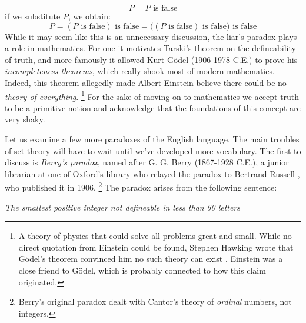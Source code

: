         \begin{equation}
            P=P\text{ is false}
        \end{equation}
        if we substitute $P$, we obtain:
        \begin{equation}
            P=(P\text{ is false})\text{ is false}
             =\big((P\text{ is false})\text{ is false}\big)\text{ is false}
        \end{equation}
        While it may seem like this is an unnecessary discussion, the liar's
        paradox plays a role in mathematics. For one it motivates Tarski's
        theorem on the defineability of truth, and more famously it allowed Kurt
        G\"{o}del (1906-1978 C.E.) to prove his
        \textit{incompleteness theorems}, which really shook most of modern
        mathematics. Indeed, this theorem allegedly made Albert
        Einstein believe there could be no
        \textit{theory of everything}.%
        \footnote{%
            A theory of physics that could solve all problems great and small.
            While no direct quotation from Einstein could be found, Stephen
            Hawking wrote that G\"{o}del's theorem convinced him no such theory
            can exist \cite{hawking2002godel}. Einstein was a close friend to
            G\"{o}del, which is probably connected to how this claim originated.
        }
        For the sake of moving on to mathematics we accept truth to be a
        primitive notion and acknowledge that the foundations of this concept
        are very shaky.
        \par\hfill\par
        Let us examine a few more paradoxes of the English language. The main
        troubles of set theory will have to wait until we've developed more
        vocabulary. The first to discuss is
        \textit{Berry's paradox},
        named after G. G. Berry (1867-1928 C.E.), a junior
        librarian at one of Oxford's library who relayed the paradox to Bertrand
        Russell \cite[p.~63]{CamCompBertRuss03}, who published it in 1906.%
        \footnote{%
            Berry's original paradox dealt with Cantor's theory of
            \textit{ordinal} numbers, not integers.
        }
        The paradox arises from the following sentence:
        \begin{center}
            \textit{The smallest positive integer not defineable in less than}
            \textit{60 letters}
        \end{center}
